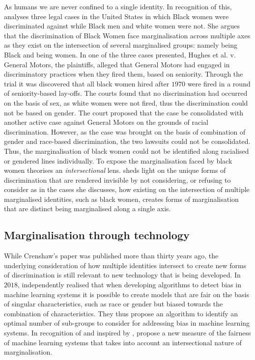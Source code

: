 As humans we are never confined to a single identity.
In recognition of this, \citet{Crenshaw:1989} analyses three legal cases in the United States in which Black women were discriminated against while Black men and white women were not.
She argues that the discrimination of Black Women face marginalisation across multiple axes as they exist on the intersection of several marginalised groups: namely being Black and being women.
In one of the three cases presented, Hughes et al. v. General Motors, the plaintiffs, alleged that General Motors had engaged in discriminatory practices when they fired them, based on seniority.
Through the trial it was discovered that all black women hired after $1970$ were fired in a round of seniority-based lay-offs.
The courts found that no discrimination had occurred on the basis of sex, as white women were not fired, thus the discrimination could not be based on gender.
The court proposed that the case be consolidated with another active case against General Motors on the grounds of racial discrimination.
However, as the case was brought on the basis of combination of gender and race-based discrimination, the two lawsuits could not be consolidated. 
Thus, the marginalisation of black women could not be identified along racialised or gendered lines individually. 
To expose the marginalisation faced by black women \citet{Crenshaw:1989} theorises an \textit{intersectional} lens.
\citet{Crenshaw:1989} sheds light on the unique forms of discrimination that are rendered invisible by not considering, or refusing to consider as in the cases she discusses, how existing on the intersection of multiple marginalised identities, such as black women, creates forms of marginalisation that are distinct being marginalised along a single axis.

\subsection{Marginalisation through technology}

While Crenshaw's \citep{Crenshaw:1989} paper was published more than thirty years ago, the underlying consideration of how multiple identities intersect to create new forms of discrimination is still relevant to new technology that is being developed. 
In $2018$, \citet{Kearns:2018} independently realised that when developing algorithms to detect bias in machine learning systems it is possible to create models that are fair on the basis of singular characteristics, such as race or gender but biased towards the combination of characteristics.
They thus propose an algorithm to identify an optimal number of sub-groups to consider for addressing bias in machine learning systems. 
In recognition of \citet{Kearns:2018} and inspired by \citet{Crenshaw:1989}, \citet{Foulds:2019} propose a new measure of the fairness of machine learning systems that takes into account an intersectional nature of marginalisation.

